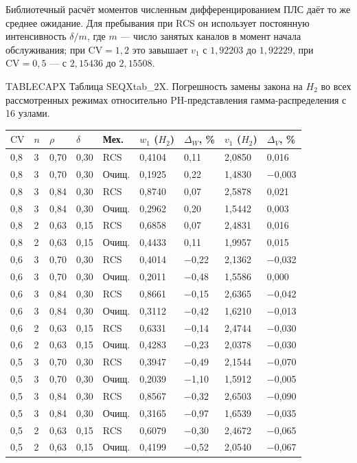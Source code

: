 Библиотечный расчёт моментов численным дифференцированием ПЛС даёт то же среднее ожидание. Для пребывания при RCS он использует постоянную интенсивность \(\delta/m\), где \(m\) --- число занятых каналов в момент начала обслуживания; при \(\mathrm{CV}=1{,}2\) это завышает \(v_1\) с \(1{,}92203\) до \(1{,}92229\), при \(\mathrm{CV}=0{,}5\) --- с \(2{,}15436\) до \(2{,}15508\).

\noindent TABLECAPX Таблица SEQXtab_2X. Погрешность замены закона на \(H_2\) во всех рассмотренных режимах относительно PH-представления гамма-распределения с 16 узлами.\par

\setlength{\tabcolsep}{2pt}
\begin{tabular}{p{1.0cm}p{0.8cm}p{1.2cm}p{1.2cm}p{1.5cm}p{2.0cm}p{2.0cm}p{2.0cm}p{2.0cm}}
\toprule
$\mathrm{CV}$ & $n$ & $\rho$ & $\delta$ & Мех. & $w_1$ ($H_2$) & $\Delta_W$, \% & $v_1$ ($H_2$) & $\Delta_V$, \% \\
\midrule
0,8 & 3 & 0,70 & 0,30 & RCS & 0,4104 & 0,11 & 2,0850 & 0,016 \\
0,8 & 3 & 0,70 & 0,30 & Очищ. & 0,1925 & 0,22 & 1,4830 & −0,003 \\
0,8 & 3 & 0,84 & 0,30 & RCS & 0,8740 & 0,07 & 2,5878 & 0,021 \\
0,8 & 3 & 0,84 & 0,30 & Очищ. & 0,2962 & 0,20 & 1,5442 & 0,003 \\
0,8 & 2 & 0,63 & 0,15 & RCS & 0,6858 & 0,07 & 2,4831 & 0,016 \\
0,8 & 2 & 0,63 & 0,15 & Очищ. & 0,4433 & 0,11 & 1,9957 & 0,015 \\
0,6 & 3 & 0,70 & 0,30 & RCS & 0,4014 & −0,22 & 2,1362 & −0,032 \\
0,6 & 3 & 0,70 & 0,30 & Очищ. & 0,2011 & −0,48 & 1,5586 & 0,000 \\
0,6 & 3 & 0,84 & 0,30 & RCS & 0,8661 & −0,15 & 2,6365 & −0,042 \\
0,6 & 3 & 0,84 & 0,30 & Очищ. & 0,3112 & −0,42 & 1,6210 & −0,013 \\
0,6 & 2 & 0,63 & 0,15 & RCS & 0,6331 & −0,14 & 2,4744 & −0,030 \\
0,6 & 2 & 0,63 & 0,15 & Очищ. & 0,4283 & −0,23 & 2,0378 & −0,030 \\
0,5 & 3 & 0,70 & 0,30 & RCS & 0,3947 & −0,49 & 2,1544 & −0,070 \\
0,5 & 3 & 0,70 & 0,30 & Очищ. & 0,2039 & −1,10 & 1,5912 & −0,005 \\
0,5 & 3 & 0,84 & 0,30 & RCS & 0,8567 & −0,32 & 2,6503 & −0,090 \\
0,5 & 3 & 0,84 & 0,30 & Очищ. & 0,3165 & −0,97 & 1,6539 & −0,035 \\
0,5 & 2 & 0,63 & 0,15 & RCS & 0,6079 & −0,30 & 2,4672 & −0,065 \\
0,5 & 2 & 0,63 & 0,15 & Очищ. & 0,4199 & −0,52 & 2,0540 & −0,067 \\
\bottomrule
\end{tabular}




